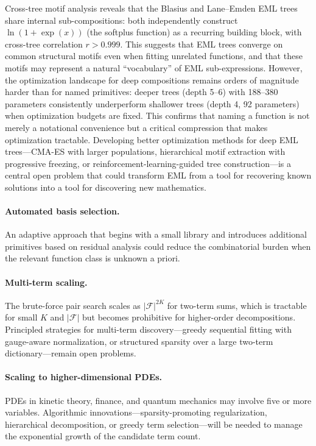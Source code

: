 Cross-tree motif analysis reveals that the Blasius and Lane--Emden EML trees
share internal sub-compositions: both independently construct
$\ln(1 + \exp(x))$ (the softplus function) as a recurring building block,
with cross-tree correlation $r > 0.999$.  This suggests that EML trees
converge on common structural motifs even when fitting unrelated functions,
and that these motifs may represent a natural ``vocabulary'' of EML
sub-expressions.  However, the optimization landscape for deep compositions
remains orders of magnitude harder than for named primitives: deeper trees
(depth 5--6) with 188--380 parameters consistently underperform shallower
trees (depth 4, 92 parameters) when optimization budgets are fixed.
This confirms that naming a function is not merely a notational convenience
but a critical compression that makes optimization tractable.  Developing
better optimization methods for deep EML trees---CMA-ES with larger
populations, hierarchical motif extraction with progressive freezing, or
reinforcement-learning-guided tree construction---is a central open problem
that could transform EML from a tool for recovering known solutions into
a tool for discovering new mathematics.

\paragraph{Automated basis selection.}
An adaptive approach that begins with a small library and introduces additional
primitives based on residual analysis could reduce the combinatorial burden when
the relevant function class is unknown a priori.

\paragraph{Multi-term scaling.}
The brute-force pair search scales as $|\mathcal{F}|^{2K}$ for two-term sums,
which is tractable for small $K$ and $|\mathcal{F}|$ but becomes prohibitive
for higher-order decompositions.  Principled strategies for multi-term
discovery---greedy sequential fitting with gauge-aware normalization, or
structured sparsity over a large two-term dictionary---remain open problems.

\paragraph{Scaling to higher-dimensional PDEs.}
PDEs in kinetic theory, finance, and quantum mechanics may involve five or more
variables.  Algorithmic innovations---sparsity-promoting regularization,
hierarchical decomposition, or greedy term selection---will be needed to manage
the exponential growth of the candidate term count.

